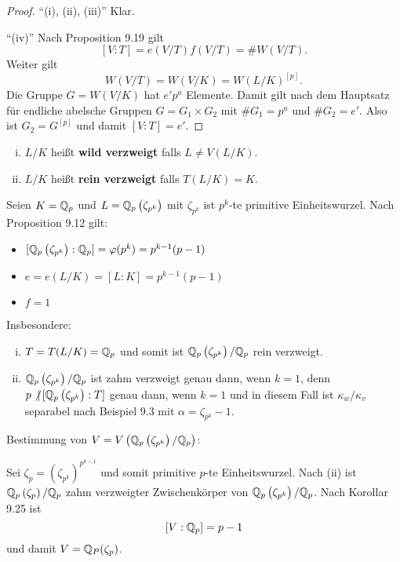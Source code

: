 \begin{proof}
	\enquote{(i), (ii), (iii)} Klar.
	
	\bigskip \enquote{(iv)} Nach Proposition 9.19 gilt
	\[ [V:T] = e(V/T)f(V/T) = \#W(V/T).
	\]
	Weiter gilt
	\[ W(V/T)=W(V/K)=W(L/K)^{[p]}.
	\]
	Die Gruppe $G=W(V/K)$ hat $e'p^a$ Elemente. Damit gilt nach dem Hauptsatz für endliche abelsche Gruppen $G=G_1 \times G_2$ mit $\# G_1 = p^a$ und $\# G_2 =e'$.
	Also ist $G_2 =G^{[p]}$ und damit $[V:T] = e'$.
\end{proof}

\begin{defi}
	\begin{enumerate}[(i)]
		\item $L/K$ heißt \textbf{wild verzweigt} falls $L \neq V(L/K)$.
		\item $L/K$ heißt \textbf{rein verzweigt} falls $T(L/K) = K$.		
	\end{enumerate}
\end{defi}

\begin{Bsp}
	Seien $K=\mathbb{Q}_p$ und $L=\mathbb{Q}_p\left( \zeta_{p^k} \right)$ mit $ \zeta_{p^k} $ ist $p^k$-te primitive Einheitswurzel. Nach Proposition 9.12 gilt:
	\begin{itemize}
		\item $[\mathbb{Q}_p\left( \zeta_{p^k} \right):\mathbb{Q}_p] = \varphi(p^k) = p^{k-1}(p-1)$
		\item $e=e(L/K)=[L:K]=p^{k-1}(p-1)$
		\item $f=1$
	\end{itemize}
	Insbesondere:
	\begin{enumerate}[(i)]
		\item $T=T(L/K)=\mathbb{Q}_p$ und somit ist $\mathbb{Q}_p\left( \zeta_{p^k} \right) / \mathbb{Q}_p$ rein verzweigt.
		\item $\mathbb{Q}_p\left( \zeta_{p^k} \right)/\mathbb{Q}_p$ ist zahm verzweigt genau dann, wenn $k = 1$,
		denn $p \not| \, [\mathbb{Q}_p\left( \zeta_{p^k} \right):T]$ genau dann, wenn $k=1$ und in diesem Fall ist $\kappa_w / \kappa_v$ separabel nach Beispiel 9.3 mit $\alpha = \zeta_{p^k} -1$.
	\end{enumerate}
	Bestimmung von $V=V \left(  \mathbb{Q}_p\left( \zeta_{p^k} \right)/\mathbb{Q}_p  \right)$:
	
	Sei $\zeta_p = \left( \zeta_{p^k} \right)^{p^{k-1}}$ und somit primitive $p$-te Einheitswurzel.
	Nach (ii) ist $\mathbb{Q}_p\left( \zeta_p \right)/\mathbb{Q}_p$ zahm verzweigter Zwischenkörper von $\mathbb{Q}_p\left( \zeta_{p^k} \right)/\mathbb{Q}_p$. Nach Korollar 9.25 ist
	\[ [V:\mathbb{Q}_p] = p-1
	\]
	und damit $V=\mathbb{Q}_P(\zeta_p)$.
\end{Bsp}


